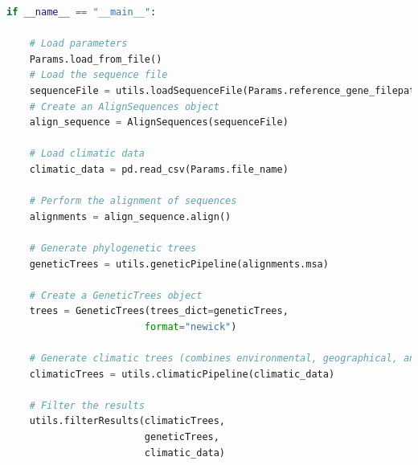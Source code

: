 \begin{lstlisting}[label=lst:main,language=Python,caption=Main script for tutorial using the aPhyloGeo package.]
if __name__ == "__main__":

    # Load parameters
    Params.load_from_file()
    # Load the sequence file
    sequenceFile = utils.loadSequenceFile(Params.reference_gene_filepath)
    # Create an AlignSequences object
    align_sequence = AlignSequences(sequenceFile)

    # Load climatic data 
    climatic_data = pd.read_csv(Params.file_name)

    # Perform the alignment of sequences
    alignments = align_sequence.align()

    # Generate phylogenetic trees
    geneticTrees = utils.geneticPipeline(alignments.msa)
    
    # Create a GeneticTrees object
    trees = GeneticTrees(trees_dict=geneticTrees, 
                        format="newick")
   
    # Generate climatic trees (combines environmental, geographical, and climatic data)
    climaticTrees = utils.climaticPipeline(climatic_data)
    
    # Filter the results
    utils.filterResults(climaticTrees, 
                        geneticTrees, 
                        climatic_data)

\end{lstlisting}

